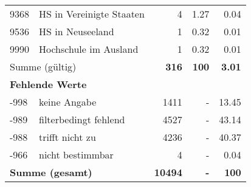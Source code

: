 \begin{longtable}{lXrrr}
        9368 & \multicolumn{1}{X}{HS in Vereinigte Staaten} & %
          \num{4} &
          \num[round-mode=places,round-precision=2]{1,27} &
          \num[round-mode=places,round-precision=2]{0,04} \\

        9536 & \multicolumn{1}{X}{HS in Neuseeland} & %
          \num{1} &
          \num[round-mode=places,round-precision=2]{0,32} &
          \num[round-mode=places,round-precision=2]{0,01} \\

        9990 & \multicolumn{1}{X}{Hochschule im Ausland} & %
          \num{1} &
          \num[round-mode=places,round-precision=2]{0,32} &
          \num[round-mode=places,round-precision=2]{0,01} \\

     \midrule
     \multicolumn{2}{l}{Summe (gültig)} &
       \textbf{\num{316}} &
     \textbf{100} &
       \textbf{\num[round-mode=places,round-precision=2]{3,01}} \\
     \multicolumn{5}{l}{\textbf{Fehlende Werte}}\\
       -998 &
       keine Angabe &
         \num{1411} &
        - &
         \num[round-mode=places,round-precision=2]{13,45} \\
       -989 &
       filterbedingt fehlend &
         \num{4527} &
        - &
         \num[round-mode=places,round-precision=2]{43,14} \\
       -988 &
       trifft nicht zu &
         \num{4236} &
        - &
         \num[round-mode=places,round-precision=2]{40,37} \\
       -966 &
       nicht bestimmbar &
         \num{4} &
        - &
         \num[round-mode=places,round-precision=2]{0,04} \\
     \midrule
     \multicolumn{2}{l}{\textbf{Summe (gesamt)}} &
          \textbf{\num{10494}} &
        \textbf{-} &
        \textbf{100} \\
     \bottomrule
     \end{longtable}
     
